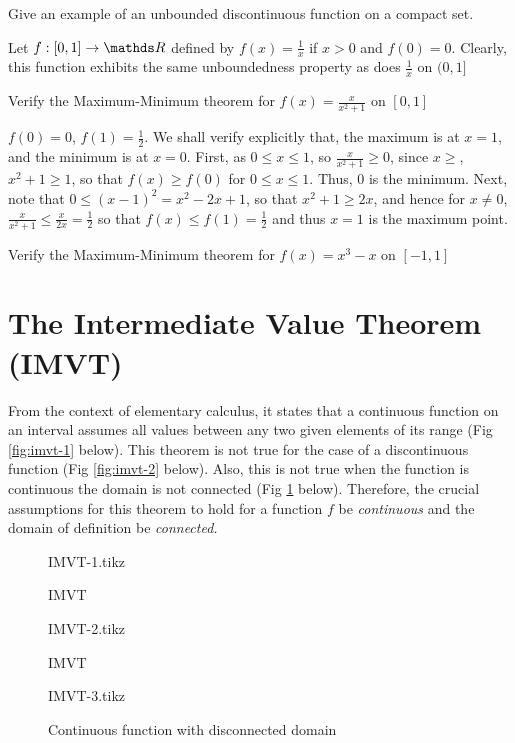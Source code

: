 \documentclass[../main-sheet.tex]{subfiles}
\begin{document}
\begin{prob}
    Give an example of an unbounded discontinuous function on a compact set.
\end{prob}
\begin{soln}
    Let $ f:[0,1]\to\R $ defined by $ f(x)=\frac{1}{x} $ if $ x>0 $ and $ f(0)=0 $. Clearly, this function exhibits the same unboundedness property as does $ \frac{1}{x} $ on $ (0,1] $
\end{soln}
\begin{prob}
    Verify the Maximum-Minimum theorem for $ f(x)=\frac{x}{x^2+1} $ on $ [0,1] $
\end{prob}
\begin{soln}
    $ f(0)=0 $, $ f(1)=\frac{1}{2} $. We shall verify explicitly that, the maximum is at $ x=1 $, and the minimum is at $ x=0 $. First, as $ 0\leq x\leq 1 $, so $ \frac{x}{x^2+1} \geq 0 $, since $ x\geq $, $ x^2+1\geq 1 $, so that $ f(x)\geq f(0) $ for $ 0\leq x\leq 1 $. Thus, 0 is the minimum. Next, note that $ 0\leq (x-1)^2=x^2-2x+1 $, so that $ x^2+1\geq 2x $, and hence for $ x\neq 0 $, $ \frac{x}{x^2+1}\leq\frac{x}{2x}=\frac{1}{2} $ so that $ f(x)\leq f(1)=\frac{1}{2} $ and thus $ x=1  $ is the maximum point.
\end{soln}
\begin{prob}
    Verify the Maximum-Minimum theorem for $ f(x)=x^3-x $ on $ [-1,1] $
\end{prob}
\section{The Intermediate Value Theorem (IMVT)}
From the context of elementary calculus, it states that a continuous function on an interval assumes all values between any two given elements of its range (Fig \ref{fig:imvt-1} below). This theorem is not true for the case of a discontinuous function (Fig \ref{fig:imvt-2} below). Also, this is not true when the function is continuous the domain is not connected (Fig \ref{fig:imvt-3} below). Therefore, the crucial assumptions for this theorem to hold for a function $ f $ be \emph{continuous} and the domain of definition be \emph{connected.}
\begin{figure}[H]
    \centering
    \begin{minipage}{0.3\textwidth}
        \centering
        {IMVT-1.tikz}
        \caption{IMVT}
        \label{fig:imvt-1}
    \end{minipage}\hfill
    \begin{minipage}{0.3\textwidth}
        \centering
        {IMVT-2.tikz}
        \caption{IMVT}
        \label{fig:imvt-2}
    \end{minipage}\hfill
    \begin{minipage}{0.3\textwidth}
        \centering
        {IMVT-3.tikz}
        \caption{Continuous function with disconnected domain}
        \label{fig:imvt-3}
    \end{minipage}
\end{figure}
\end{document}
